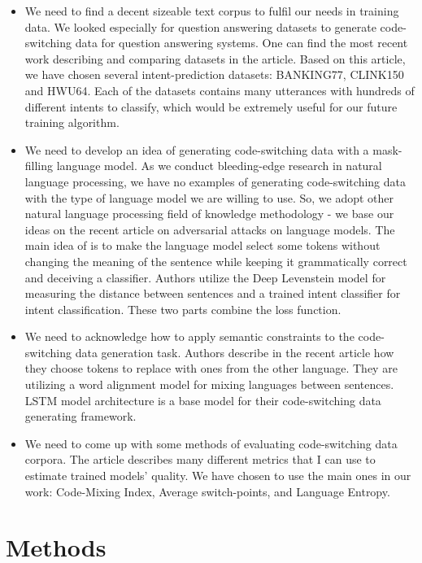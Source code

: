 \documentclass[conference]{IEEEtran}
\begin{document}
\begin{itemize}
    \item We need to find a decent sizeable text corpus to fulfil our needs in training data. We looked especially for question answering datasets to generate code-switching data for question answering systems. One can find the most recent work describing and comparing datasets in the \cite{glue} article. Based on this article, we have chosen several intent-prediction datasets: BANKING77, CLINK150 and HWU64. Each of the datasets contains many utterances with hundreds of different intents to classify, which would be extremely useful for our future training algorithm.
    \item We need to develop an idea of generating code-switching data with a mask-filling language model. As we conduct bleeding-edge research in natural language processing, we have no examples of generating code-switching data with the type of language model we are willing to use. So, we adopt other natural language processing field of knowledge methodology - we base our ideas on the recent article on adversarial attacks on language models. The main idea of \cite{dilma} is to make the language model select some tokens without changing the meaning of the sentence while keeping it grammatically correct and deceiving a classifier. Authors utilize the Deep Levenstein model for measuring the distance between sentences and a trained intent classifier for intent classification. These two parts combine the loss function.
    \item We need to acknowledge how to apply semantic constraints to the code-switching data generation task. Authors describe in the recent article \cite{lstm} how they choose tokens to replace with ones from the other language. They are utilizing a word alignment model for mixing languages between sentences. LSTM model architecture is a base model for their code-switching data generating framework. 
    \item We need to come up with some methods of evaluating code-switching data corpora. The \cite{glue2} article describes many different metrics that I can use to estimate trained models' quality. We have chosen to use the main ones in our work: Code-Mixing Index, Average switch-points, and Language Entropy.
\end{itemize}

\section{Methods}
\end{document}
